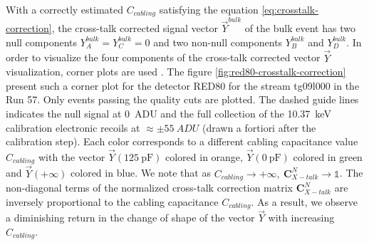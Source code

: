 With a correctly estimated $C_{cabling}$ satisfying the equation \ref{eq:crosstalk-correction}, the cross-talk corrected signal vector $\vec{Y}^{bulk}$ of the bulk event has two null components $Y_A^{bulk} = Y_C^{bulk} = 0$ and two non-null components $Y_B^{bulk}$ and $Y_D^{bulk}$.
In order to visualize the four components of the cross-talk corrected vector $\vec{Y}$ visualization, corner plots are used . The figure \ref{fig:red80-crosstalk-correction} present such a corner plot for the detector RED80 for the stream tg09l000 in the Run 57. Only events passing the quality cuts are plotted. The dashed guide lines indicates the null signal at \SI{0}{ADU} and the full collection of the \SI{10.37}{\kilo\eV} calibration electronic recoils  at $\approx \pm \SI{55}{ADU}$ (drawn a fortiori after the calibration step).
Each color corresponds to a different cabling capacitance value $C_{cabling}$ with the vector $\vec{Y}(\SI{125}{\pico\farad})$ colored in orange, $\vec{Y}(\SI{0}{\pico\farad})$ colored in green and $\vec{Y}(+\infty)$ colored in blue. We note that as $C_{cabling} \rightarrow +\infty, \ \bm{C}_{X-talk}^N \rightarrow \mathbb{1}$. The non-diagonal terms of the normalized cross-talk correction matrix $\bm{C}_{X-talk}^N$ are inversely proportional to the cabling capacitance $C_{cabling}$. As a result, we observe a diminishing return in the change of shape of the vector $\vec{Y}$ with increasing $C_{cabling}$.


